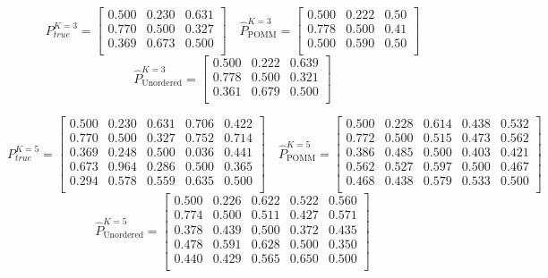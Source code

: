 \documentclass[11pt]{amsart}
\begin{document}
\newpage
\[
P^{K=3}_{true} = 
\left[\begin{array}{ccc}
0.500 & 0.230 & 0.631 \\
0.770 & 0.500 & 0.327 \\
0.369 & 0.673 & 0.500 \\
\end{array}\right] \quad 
\hat{P}^{K=3}_{\text{POMM}} = 
\left[\begin{array}{ccc}
0.500 & 0.222 & 0.50 \\
0.778 & 0.500 & 0.41 \\
0.500 & 0.590 & 0.50 \\
\end{array}\right] 
\]
\[ 
\hat{P}^{K=3}_{\text{Unordered}} = 
\left[\begin{array}{ccc}
0.500 & 0.222 & 0.639 \\
0.778 & 0.500 & 0.321 \\
0.361 & 0.679 & 0.500 \\
\end{array}\right]
\]

\[
P^{K=5}_{true} = 
\left[\begin{array}{ccccc}
0.500 & 0.230 & 0.631 & 0.706 & 0.422 \\
0.770 & 0.500 & 0.327 & 0.752 & 0.714 \\
0.369 & 0.248 & 0.500 & 0.036 & 0.441 \\
0.673 & 0.964 & 0.286 & 0.500 & 0.365 \\
0.294 & 0.578 & 0.559 & 0.635 & 0.500 \\
\end{array}\right] \quad 
\hat{P}^{K=5}_{\text{POMM}} = 
\left[\begin{array}{ccccc}
0.500 & 0.228 & 0.614 & 0.438 & 0.532 \\
0.772 & 0.500 & 0.515 & 0.473 & 0.562 \\
0.386 & 0.485 & 0.500 & 0.403 & 0.421 \\
0.562 & 0.527 & 0.597 & 0.500 & 0.467 \\
0.468 & 0.438 & 0.579 & 0.533 & 0.500 \\
\end{array}\right] 
\]
\[ 
\hat{P}^{K=5}_{\text{Unordered}} = 
\left[\begin{array}{ccccc}
0.500 & 0.226 & 0.622 & 0.522 & 0.560 \\
0.774 & 0.500 & 0.511 & 0.427 & 0.571 \\
0.378 & 0.439 & 0.500 & 0.372 & 0.435 \\
0.478 & 0.591 & 0.628 & 0.500 & 0.350 \\
0.440 & 0.429 & 0.565 & 0.650 & 0.500 \\
\end{array}\right]
\]
\end{document}
